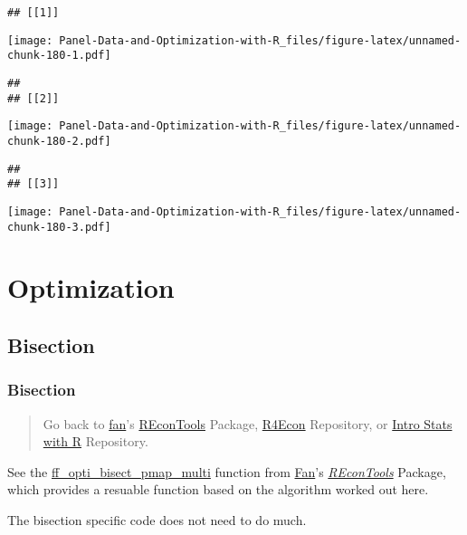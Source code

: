 \documentclass[
]{book}
\begin{document}
\begin{verbatim}
## [[1]]
\end{verbatim}

\texttt{[image: Panel-Data-and-Optimization-with-R\_files/figure-latex/unnamed-chunk-180-1.pdf]}

\begin{verbatim}
## 
## [[2]]
\end{verbatim}

\texttt{[image: Panel-Data-and-Optimization-with-R\_files/figure-latex/unnamed-chunk-180-2.pdf]}

\begin{verbatim}
## 
## [[3]]
\end{verbatim}

\texttt{[image: Panel-Data-and-Optimization-with-R\_files/figure-latex/unnamed-chunk-180-3.pdf]}

\hypertarget{optimization}{%
\chapter{Optimization}\label{optimization}}

\hypertarget{bisection}{%
\section{Bisection}\label{bisection}}

\hypertarget{bisection-1}{%
\subsection{Bisection}\label{bisection-1}}

\begin{quote}
Go back to \href{http://fanwangecon.github.io/CodeDynaAsset/}{fan}'s \href{https://fanwangecon.github.io/REconTools/}{REconTools} Package, \href{https://fanwangecon.github.io/R4Econ/}{R4Econ} Repository, or \href{https://fanwangecon.github.io/Stat4Econ/}{Intro Stats with R} Repository.
\end{quote}

See the \href{https://fanwangecon.github.io/REconTools/reference/ff_opti_bisect_pmap_multi.html}{ff\_opti\_bisect\_pmap\_multi} function from \href{https://fanwangecon.github.io/}{Fan}'s \emph{\href{https://fanwangecon.github.io/REconTools/}{REconTools}} Package, which provides a resuable function based on the algorithm worked out here.

The bisection specific code does not need to do much.
\end{document}
